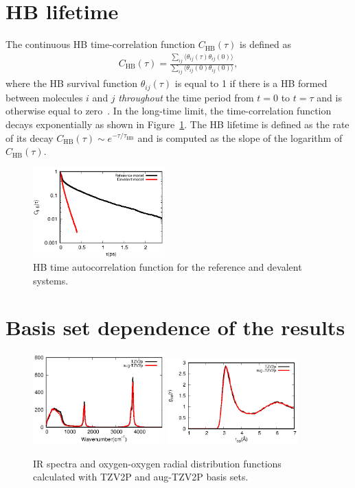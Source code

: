\documentclass[10pt,amsmath,twocolumn,aps,prl,superscriptaddress,floatfix]{revtex4-1}
\newcommand{\bea}{\begin{eqnarray}}
\newcommand{\eea}{\end{eqnarray}}
\begin{document}
\section{HB lifetime} 

The continuous HB time-correlation function $C_{\text{HB}}(\tau)$ is defined as 
%
\bea
C_{\text{HB}}(\tau) = \frac{\sum_{ij}\langle \theta_{ij}(\tau)\theta_{ij}(0) \rangle}{\sum_{ij}\langle \theta_{ij}(0) \theta_{ij}(0) \rangle} \label{Eq:HBdecay},
\eea
%
where the HB survival function $\theta_{ij}(\tau)$ is equal to 1 if there is a HB formed between molecules $i$ and $j$ \emph{throughout} the time period from $t=0$ to $t=\tau$ and is otherwise equal to zero~\cite{rapaport1983hydrogen,starr1999fast}. 
In the long-time limit, the time-correlation function decays exponentially as shown in Figure~\ref{Fig:HBdecay}. 
The HB lifetime is defined as the rate of its decay $C_{\text{HB}}(\tau) \sim e^{-\tau/\tau_{\text{HB}}}$ and is computed as the slope of the logarithm of $C_{\text{HB}}(\tau)$.


\begin{figure}
\includegraphics[width=0.45\textwidth]{new_hbdecay}
\caption{HB time autocorrelation function for the reference and devalent systems.} \label{Fig:HBdecay}
\end{figure}

\section{Basis set dependence of the results} 

\begin{figure}
\includegraphics[width=0.45\textwidth]{basis_ir}
\includegraphics[width=0.45\textwidth]{basis_rdf}
\caption{IR spectra and oxygen-oxygen radial distribution functions calculated with TZV2P and aug-TZV2P basis sets.}\label{Fig:basis}
\end{figure} 
\end{document}
